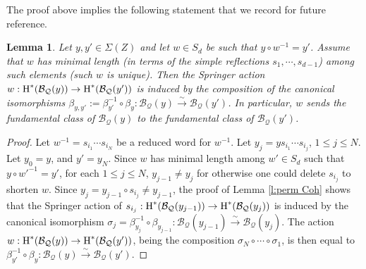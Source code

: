\documentclass[reqno]{amsart}
\numberwithin{equation}{section}
\newcommand{\isom}{\stackrel{\sim}{\to}}
\renewcommand\c{\circ}
\newcommand{\cohog}[2]{\textup{H}^{#1}({#2})}     %
\renewcommand\b\beta
\newcommand{\s}{\sigma}
\newcommand\cB{\mathcal{B}}
\newcommand\cQ{\mathcal{Q}}
\newtheorem{lemma}[thm]{Lemma}
\theoremstyle{remark}
\numberwithin{equation}{section}
\begin{document}
The proof above implies the following statement that we record for future reference.
\begin{lemma}\label{l:min w} Let $y,y'\in \Sigma(Z)$ and let $w\in S_{d}$ be such that $y\c w^{-1}=y'$. Assume that $w$ has minimal length (in terms of the simple reflections $s_{1},\cdots, s_{d-1}$) among such elements (such $w$ is unique). Then the Springer action $w: \cohog{*}{\cB_{\cQ}(y)}\to \cohog{*}{\cB_{\cQ}(y')}$ is induced by the composition of the canonical isomorphisms $\b_{y,y'}:=\b_{y'}^{-1}\c\b_{y}: \cB_{\cQ}(y)\isom \cB_{\cQ}(y')$. In particular, $w$ sends the fundamental class of $\cB_{\cQ}(y)$ to the fundamental class of $\cB_{\cQ}(y')$.
\end{lemma}
\begin{proof}
Let $w^{-1}=s_{i_{1}}\cdots s_{i_{N}}$ be a reduced word for $w^{-1}$. Let $y_{j}=ys_{i_{1}}\cdots s_{i_{j}}$, $1\le j\le N$. Let $y_{0}=y$, and $y'=y_{N}$. Since $w$ has minimal length among $w'\in S_{d}$ such that $y\c w'^{-1}=y'$, for each $1\le j\le N$, $y_{j-1}\ne y_{j}$ for otherwise one could delete $s_{i_{j}}$ to shorten $w$. Since $y_{j}=y_{j-1}\c s_{i_{j}}\ne y_{j-1}$, the proof of Lemma \ref{l:perm Coh} shows that the Springer action of $s_{i_{j}}: \cohog{*}{\cB_{\cQ}(y_{j-1})}\to \cohog{*}{\cB_{\cQ}(y_{j})}$ is induced by the canonical isomorphism $\s_{j}=\b^{-1}_{y_{j}}\c\b_{y_{j-1}}: \cB_{\cQ}(y_{j-1})\isom \cB_{\cQ}(y_{j})$. The action $w: \cohog{*}{\cB_{\cQ}(y)}\to \cohog{*}{\cB_{\cQ}(y')}$, being the composition $\s_{N}\c\cdots\c\s_{1}$, is then equal to $\b_{y'}^{-1}\c\b_{y}:\cB_{\cQ}(y)\isom \cB_{\cQ}(y')$. 
\end{proof}

\end{document}
